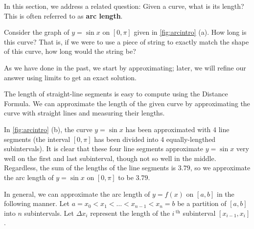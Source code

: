 In this section, we address a related question: Given a curve, what is its length? This is often referred to as \textbf{arc length}. 

Consider the graph of $y=\sin x$ on $[0,\pi]$ given in \autoref{fig:arcintro} (a). How long is this curve? That is, if we were to use a piece of string to exactly match the shape of this curve, how long would the string be?

As we have done in the past, we start by approximating; later, we will refine our answer using limits to get an exact solution.

The length of straight-line segments is easy to compute using the Distance Formula. We can approximate the length of the given curve by approximating the curve with straight lines and measuring their lengths. 

In \autoref{fig:arcintro} (b), the curve $y=\sin x$ has been approximated with 4 line segments (the interval $[0,\pi]$ has been divided into 4 equally-lengthed subintervals). It is clear that these four line segments approximate $y=\sin x$ very well on the first and last subinterval, though not so well in the middle. Regardless, the sum of the lengths of the line segments is $3.79$, so we approximate the arc length of $y=\sin x$ on $[0,\pi]$ to be $3.79$. 


In general,  we can approximate the arc length of $y=f(x)$ on $[a,b]$ in the following manner. Let $a=x_0 < x_1 < \dotso < x_{n-1}< x_n=b$ be a partition of $[a,b]$ into $n$ subintervals. Let $\Delta x_i$ represent the length of the $i\,^\text{th}$ subinterval $[x_{i-1},x_i]$.

